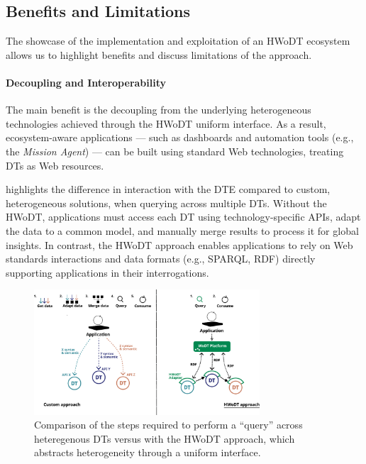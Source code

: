 

\subsection{Benefits and Limitations}
\label{ssec:benefits-limitations}


The showcase of the implementation and exploitation of an \ac{HWoDT} ecosystem allows us to highlight benefits and discuss limitations of the approach.

\paragraph{Decoupling and Interoperability}
The main benefit is the decoupling from the underlying heterogeneous technologies achieved through the \ac{HWoDT} uniform interface.
%
As a result, ecosystem-aware applications — such as dashboards and automation tools (e.g., the \emph{Mission Agent}) — can be built using standard Web technologies, treating \acp{DT} as Web resources.

 highlights the difference in interaction with the \ac{DTE} compared to custom, heterogeneous solutions, when querying across multiple \acp{DT}.
%
Without the \ac{HWoDT}, applications must access each \ac{DT} using technology-specific \acp{API}, adapt the data to a common model, and manually merge results to process it for global insights.
In contrast, the \ac{HWoDT} approach enables applications to rely on Web standards interactions and data formats (e.g., SPARQL, \ac{RDF}) directly supporting applications in their interrogations.

\begin{figure}[t]
  \centering
  \includegraphics[width=0.75\textwidth]{figures/hwodt/comparison_custom_hwodt.pdf}
  \caption{Comparison of the steps required to perform a ``query'' across heteregenous \acp{DT} versus with the \ac{HWoDT} approach, which abstracts heterogeneity through a uniform interface.}
  \label{fig:comparison-custom-vs-hwodt}
\end{figure}

